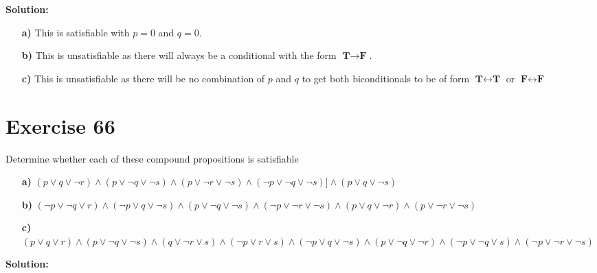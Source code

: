 \documentclass{Axon}
\begin{document}
\noindent
\textbf{Solution:}
\begin{enumerate}
    \item[\textbf{a)}] This is satisfiable with \(p = 0\) and \(q = 0\).
    \item[\textbf{b)}] This is unsatisfiable as there will always be a conditional with the form \(\textbf{T} \to \textbf{F}\).
    \item[\textbf{c)}] This is unsatisfiable as there will be no combination of \(p\) and \(q\) to get both biconditionals to be of form \(\textbf{T} \leftrightarrow \textbf{T}\) or \(\textbf{F} \leftrightarrow \textbf{F}\)
\end{enumerate}

\section*{Exercise 66}
Determine whether each of these compound propositions is satisfiable
\begin{enumerate}
    \item[\textbf{a)}] \((p \lor q \lor \lnot r) \land (p \lor \lnot q \lor \lnot s) \land (p \lor \lnot r \lor \lnot s) \land (\lnot p \lor \lnot q \lor \lnot s) ]\land (p \lor q \lor \lnot s)\)
    \item[\textbf{b)}] \((\lnot p \lor \lnot q \lor r) \land (\lnot p \lor q \lor \lnot s) \land (p \lor \lnot q \lor \lnot s) \land (\lnot p \lor \lnot r \lor \lnot s) \land (p \lor q \lor \lnot r) \land (p \lor \lnot r \lor \lnot s)\)
    \item[\textbf{c)}] \((p \lor q \lor r) \land (p \lor \lnot q \lor \lnot s) \land (q \lor \lnot r \lor s) \land (\lnot p \lor r \lor s) \land (\lnot p \lor q \lor \lnot s) \land (p \lor \lnot q \lor \lnot r) \land(\lnot p \lor \lnot q \lor s) \land (\lnot p \lor \lnot r \lor \lnot s)\)
\end{enumerate}

\noindent
\textbf{Solution:}

\printbibliography
\end{document}

